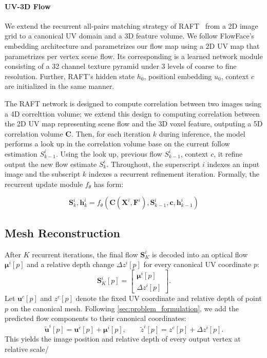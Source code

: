 \paragraph{UV-3D Flow}
We extend the recurrent all-pairs matching strategy of
RAFT~\cite{teed2020raft} from a 2D image grid to a canonical UV domain and a 3D
feature volume. We follow FlowFace's embedding architecture and parametrizes our flow map using a
2D UV map that parametrizes per vertex scene flow. Its corresponding is a learned network module consisting of a 32 channel texture pyramid
under 3 levels of coarse to fine resolution. Further, RAFT's hidden state $h_0$, positionl embedding $u_0$, context $c$ are initialized in the
same manner.

The RAFT network is designed to compute correlation between two images using a 4D
correlttion volume; we extend this design to computing correlation between the 2D UV map representing scene flow and
the 3D voxel feature, outputing a 5D correlation volume $\mathbf{C}$. Then, for each iteration $k$ during inference,
the model performs a look up in the correlation volume base on the current follow estimation $S^{i}_{k-1}$.
Using the look up, previous flow $S^{i}_{k-1}$, context $c$, it refine output the new flow estimate $S^{i}_{k}$.
Throughout, the superscript $i$ indexes an input image and the subscript $k$
indexes a recurrent refinement iteration.
Formally, the recurrent update module $f_\theta$ has form:

\begin{equation}
    \mathbf{S}^{i}_{k}, \mathbf{h}^{i}_{k}
    = f_\theta(\mathbf{C}(\mathbf{X}^{i},\mathbf{F}^{i}),
    \mathbf{S}^{i}_{k-1}, \mathbf{c}, \mathbf{h}^{i}_{k-1})
\end{equation}



\subsection{Mesh Reconstruction}
\label{sec:metric_depth}

After $K$ recurrent iterations, the final flow $\mathbf{S}^{i}_{K}$ is
decoded into an optical flow $\boldsymbol{\mu}^{i}[p]$ and a relative depth
change $\Delta z^{i}[p]$ for every canonical UV coordinate $p$:
\begin{equation}
    \mathbf{S}^{i}_{K}[p]
    =
    \begin{bmatrix}
        \boldsymbol{\mu}^{i}[p] \\
        \Delta z^{i}[p]
    \end{bmatrix}.
    \label{eq:decoded_flow}
\end{equation}
Let $\mathbf{u}^{c}[p]$ and $z^{c}[p]$ denote the fixed UV coordinate and
relative depth of point $p$ on the canonical mesh. Following
\cref{sec:problem_formulation}, we add the predicted flow components to their
canonical coordinates:
\begin{equation}
    \tilde{\mathbf{u}}^{i}[p]
        = \mathbf{u}^{c}[p]+\boldsymbol{\mu}^{i}[p],
    \qquad
    \tilde z^{i}[p]
        = z^{c}[p]+\Delta z^{i}[p].
    \label{eq:canonical_flow_decode}
\end{equation}
This yields the image position and relative depth of every output vertex at relative scale/


